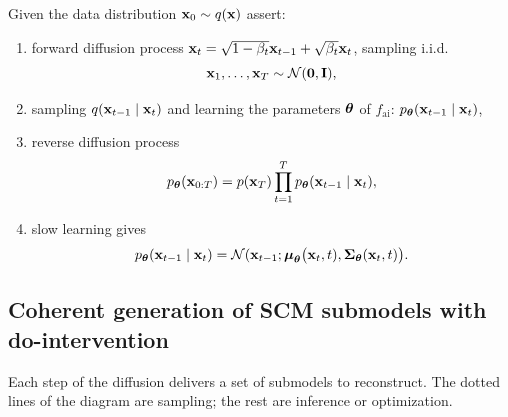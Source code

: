 \documentclass[12pt]{article}
\begin{document}
Given the data distribution $\mathbf{x}_0\sim q(\mathbf{x})$ assert:
\begin{enumerate}[1)]
\item forward diffusion process $\mathbf{x}_t = \sqrt{1-\beta_t} \mathbf{x}_{t-1} + \sqrt{\beta_t} \mathbf{x}_t$, sampling i.i.d. 
\[\mathbf{x}_1,\dots, \mathbf{x}_T\sim\mathcal{N} (\boldsymbol{0}, \mathbf{I}),\]
\item sampling $q(\mathbf{x}_{t-1}\mid\mathbf{x}_t)$ and learning the parameters ${\boldsymbol{\theta}}$ of $f_\text{ai}$: 
$p_{\boldsymbol{\theta}}(\mathbf{x}_{t-1}\mid\mathbf{x}_t)$,  
\item reverse diffusion process 
\[
p_{\boldsymbol{\theta}}(\mathbf{x}_{0:T}) = p(\mathbf{x}_T) \prod^T_{t=1} p_{\boldsymbol{\theta}}(\mathbf{x}_{t-1} \mid \mathbf{x}_t),
\]
\item  slow learning gives
\[
p_{\boldsymbol{\theta}}(\mathbf{x}_{t-1} \mid \mathbf{x}_t) = \mathcal{N}(\mathbf{x}_{t-1}; {\boldsymbol{\mu}}_{\boldsymbol{\theta}}\bigl(\mathbf{x}_t, t), \boldsymbol{\Sigma}_{\boldsymbol{\theta}}(\mathbf{x}_t, t)\bigr).
\]
\end{enumerate}

\subsection*{Coherent generation of SCM submodels with do-intervention}
Each step of the diffusion delivers a set of submodels to reconstruct. The dotted lines of the diagram are sampling; the rest are inference or optimization.
\end{document}
